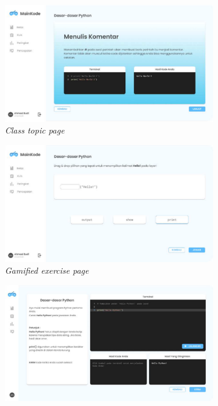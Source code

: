 \begin{figure}[H]
	\centering
	\begin{subfigure}[b]{0.4\textwidth}
		\centering
	  \includegraphics[width=\linewidth]{contents/chapter-2/images/Evan-a1.png}
	  \caption{\textit{Class topic page}}
	  \label{fig:sub1-a1}
	\end{subfigure}
	\begin{subfigure}[b]{0.4\textwidth}
	\centering
	  \includegraphics[width=\linewidth]{contents/chapter-2/images/Evan-a2.png}
	  \caption{\textit{Gamified exercise page}}
	  \label{fig:sub2-a2}
	\end{subfigure}
	\hfill
	\begin{subfigure}[b]{0.4\textwidth}
		\centering
		\includegraphics[width=\linewidth]{contents/chapter-2/images/Evan-a3.png}

\end{subfigure}
\end{figure}
